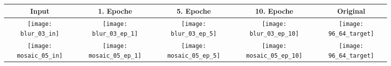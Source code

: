 \begin{figure}[!htb]
    \begin{adjustwidth}{-2cm}{}
        \begin{tabular}{ c | c | c | c | c }
            \small{Input} & \small{1. Epoche} & \small{5. Epoche} & \small{10. Epoche} & \small{Original} \\
        \hline
            \texttt{[image: blur\_03\_in]} &
            \texttt{[image: blur\_03\_ep\_1]} &
            \texttt{[image: blur\_03\_ep\_5]} &
            \texttt{[image: blur\_03\_ep\_10]} &
            \texttt{[image: 96\_64\_target]} \\
        \hline
            \texttt{[image: mosaic\_05\_in]} &
            \texttt{[image: mosaic\_05\_ep\_1]} &
            \texttt{[image: mosaic\_05\_ep\_5]} &
            \texttt{[image: mosaic\_05\_ep\_10]} &
            \texttt{[image: 96\_64\_target]} \\
        \end{tabular}
    \end{adjustwidth}
\end{figure}

\clearpage
